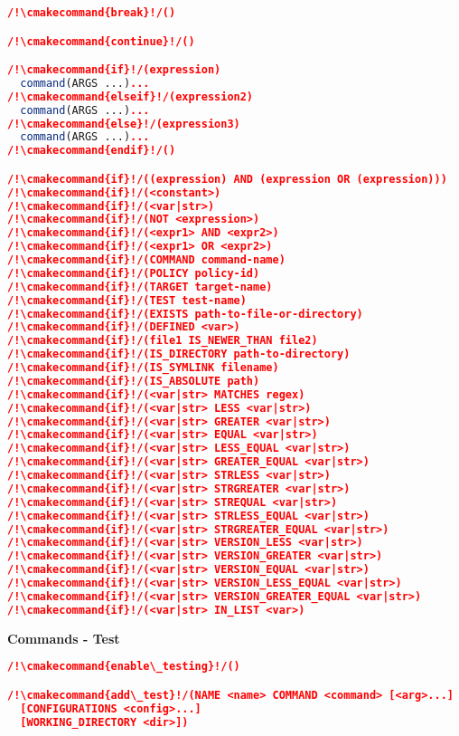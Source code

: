 \documentclass{article}
\newcommand{\cmakecommand}[1]{{\href{https://cmake.org/cmake/help/v3.20/command/#1.html}{#1}}}
\begin{document}
\begin{minipage}[t]{0.18\linewidth}
\begin{lstlisting}[language=CMake]
/!\cmakecommand{break}!/()

/!\cmakecommand{continue}!/()

/!\cmakecommand{if}!/(expression)
  command(ARGS ...)...
/!\cmakecommand{elseif}!/(expression2)
  command(ARGS ...)...
/!\cmakecommand{else}!/(expression3)
  command(ARGS ...)...
/!\cmakecommand{endif}!/()

/!\cmakecommand{if}!/((expression) AND (expression OR (expression)))
/!\cmakecommand{if}!/(<constant>)
/!\cmakecommand{if}!/(<var|str>)
/!\cmakecommand{if}!/(NOT <expression>)
/!\cmakecommand{if}!/(<expr1> AND <expr2>)
/!\cmakecommand{if}!/(<expr1> OR <expr2>)
/!\cmakecommand{if}!/(COMMAND command-name)
/!\cmakecommand{if}!/(POLICY policy-id)
/!\cmakecommand{if}!/(TARGET target-name)
/!\cmakecommand{if}!/(TEST test-name)
/!\cmakecommand{if}!/(EXISTS path-to-file-or-directory)
/!\cmakecommand{if}!/(DEFINED <var>)
/!\cmakecommand{if}!/(file1 IS_NEWER_THAN file2)
/!\cmakecommand{if}!/(IS_DIRECTORY path-to-directory)
/!\cmakecommand{if}!/(IS_SYMLINK filename)
/!\cmakecommand{if}!/(IS_ABSOLUTE path)
/!\cmakecommand{if}!/(<var|str> MATCHES regex)
/!\cmakecommand{if}!/(<var|str> LESS <var|str>)
/!\cmakecommand{if}!/(<var|str> GREATER <var|str>)
/!\cmakecommand{if}!/(<var|str> EQUAL <var|str>)
/!\cmakecommand{if}!/(<var|str> LESS_EQUAL <var|str>)
/!\cmakecommand{if}!/(<var|str> GREATER_EQUAL <var|str>)
/!\cmakecommand{if}!/(<var|str> STRLESS <var|str>)
/!\cmakecommand{if}!/(<var|str> STRGREATER <var|str>)
/!\cmakecommand{if}!/(<var|str> STREQUAL <var|str>)
/!\cmakecommand{if}!/(<var|str> STRLESS_EQUAL <var|str>)
/!\cmakecommand{if}!/(<var|str> STRGREATER_EQUAL <var|str>)
/!\cmakecommand{if}!/(<var|str> VERSION_LESS <var|str>)
/!\cmakecommand{if}!/(<var|str> VERSION_GREATER <var|str>)
/!\cmakecommand{if}!/(<var|str> VERSION_EQUAL <var|str>)
/!\cmakecommand{if}!/(<var|str> VERSION_LESS_EQUAL <var|str>)
/!\cmakecommand{if}!/(<var|str> VERSION_GREATER_EQUAL <var|str>)
/!\cmakecommand{if}!/(<var|str> IN_LIST <var>)
\end{lstlisting}

\textbf{Commands - Test}
\begin{lstlisting}[language=CMake]
/!\cmakecommand{enable\_testing}!/()

/!\cmakecommand{add\_test}!/(NAME <name> COMMAND <command> [<arg>...]
  [CONFIGURATIONS <config>...]
  [WORKING_DIRECTORY <dir>])


\end{lstlisting}
\end{minipage}
\end{document}
